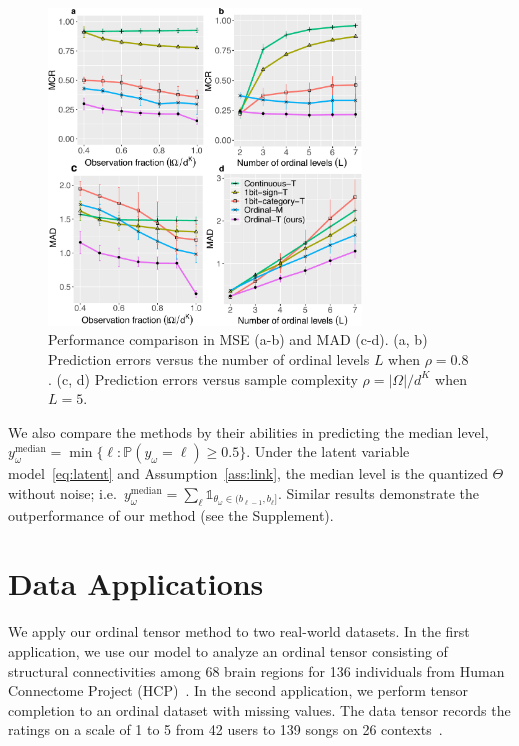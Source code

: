 \documentclass{article}
\theoremstyle{plain}
\theoremstyle{definition}
\begin{document}
\begin{figure}[t]
\includegraphics[width=8.3cm]{panel2.pdf}
\vspace{-.4cm}
\caption{Performance comparison in MSE (a-b) and MAD (c-d). (a, b) Prediction errors versus the number of ordinal levels $L$ when $\rho=0.8$. (c, d) Prediction errors versus sample complexity $\rho=|\Omega|/d^K$ when $L=5$. }\label{fig:compare}
\vspace{-.5cm}
\end{figure}


We also compare the methods by their abilities in predicting the median level, $y_\omega^{\text{median}}=\min\{\ell\colon\mathbb{P}(y_\omega=\ell)\geq 0.5\}$. Under the latent variable model~\eqref{eq:latent} and Assumption~\ref{ass:link}, the median level is the quantized $\Theta$ without noise; i.e.\ $y_\omega^{\text{median}}=\sum_\ell \mathds{1}_{\theta_\omega\in(b_{\ell-1},b_\ell]}$. Similar results demonstrate the outperformance of our method (see the Supplement). 

\section{Data Applications}
We apply our ordinal tensor method to two real-world datasets. In the first application, we use our model to analyze an ordinal tensor consisting of structural connectivities among 68 brain regions for 136 individuals from Human Connectome Project (HCP)~\citep{geddes2016human}. In the second application, we perform tensor completion to an ordinal dataset with missing values. The data tensor records the ratings on a scale of 1 to 5 from 42 users to 139 songs on 26 contexts~\citep{baltrunas2011incarmusic}.
\end{document}
